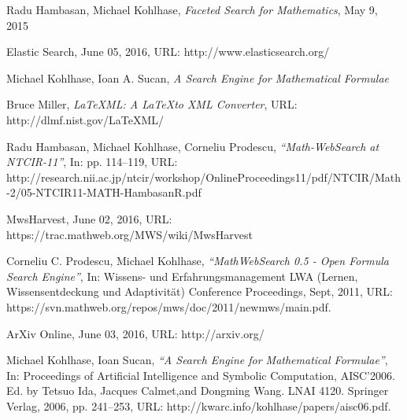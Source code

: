 \documentclass{deliverablereport}
\begin{document}
\begin{thebibliography}{}

\bibitem{}
  Radu Hambasan, Michael Kohlhase,
  \emph{Faceted Search for Mathematics},
  May 9, 2015
  
\bibitem{}
	Elastic Search,
	June 05, 2016, URL: http://www.elasticsearch.org/

\bibitem{}
	Michael Kohlhase, Ioan A. Sucan,
	\emph{A Search Engine for Mathematical Formulae}
	
\bibitem{}
	Bruce Miller, 
	\emph{LaTeXML: A \LaTeX to XML Converter}, 
	URL: http://dlmf.nist.gov/LaTeXML/

\bibitem{}
	Radu Hambasan, Michael Kohlhase, Corneliu Prodescu, 			\emph{“Math-WebSearch at NTCIR-11”}, 
	In: pp. 114–119, 
	URL: http://research.nii.ac.jp/ntcir/workshop/OnlineProceedings11/pdf/NTCIR/Math-2/05-NTCIR11-MATH-HambasanR.pdf
	
\bibitem{}
	MwsHarvest, 
	June 02, 2016, 
	URL: https://trac.mathweb.org/MWS/wiki/MwsHarvest
	
\bibitem{}
	Corneliu C. Prodescu, Michael Kohlhase, 
	\emph{“MathWebSearch 0.5 - Open Formula Search Engine”}, 		In: Wissens- und Erfahrungsmanagement LWA (Lernen, Wissensentdeckung und Adaptivität) Conference Proceedings, 			Sept, 2011, 
	URL: https://svn.mathweb.org/repos/mws/doc/2011/newmws/main.pdf.
	
\bibitem{}
	ArXiv Online, 
	June 03, 2016, URL: http://arxiv.org/
	
\bibitem{}
	Michael Kohlhase, Ioan Sucan, 
	\emph{“A Search Engine for Mathematical Formulae”}, 
	In: Proceedings of Artificial Intelligence and Symbolic
Computation, 
	AISC’2006. Ed. by Tetsuo Ida, Jacques Calmet,and Dongming Wang. LNAI 4120. Springer Verlag, 2006, pp. 241–253, 
	URL: http://kwarc.info/kohlhase/papers/aisc06.pdf.

\end{thebibliography}
\end{document}
